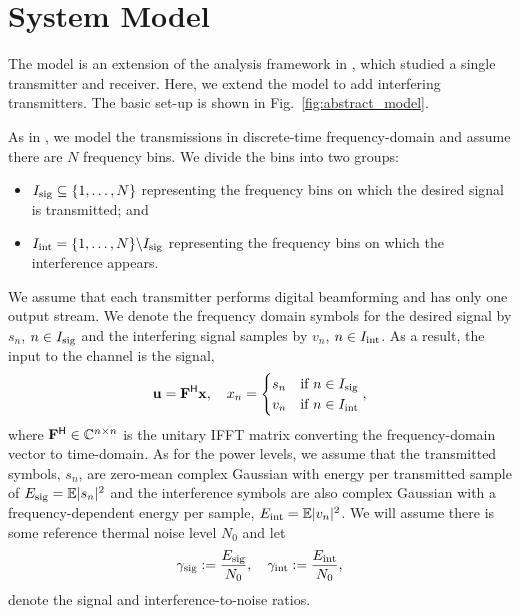 %     

\section{System Model} \label{sec:model}

The model is an extension of the analysis framework in \cite{dutta2020capacity,skrimponis2020power,skrimponis2021towards,skrimponis2020efficient},
which studied a single transmitter and receiver. Here, we extend
the model to add interfering transmitters.
The basic set-up is shown in Fig.~\ref{fig:abstract_model}.

As in \cite{dutta2020capacity,skrimponis2020power,skrimponis2021towards,skrimponis2020efficient}, we model the transmissions in discrete-time 
frequency-domain and assume there are $N$
frequency bins.  We divide the bins into two groups:
\begin{itemize}
    \item $I_{\rm sig} \subseteq \{1,\ldots,N\}$ representing the frequency bins on which the desired signal is transmitted; and
    \item $I_{\rm int} = \{1,\ldots,N\} \backslash I_{\rm sig}$ representing the frequency bins on which the interference appears.
\end{itemize}
We assume that each transmitter performs digital beamforming and has 
only one output stream. We denote the frequency domain symbols for the
desired signal by $s_n$, $n\in I_{\rm sig}$
and the interfering signal samples by $v_n$,
$n \in I_{\rm int}$.  As a result, the input to the channel
is the signal,
\begin{equation}
    {\mathbf{u}} = {\mathbf{F}} ^{\text{\sf H}} {\mathbf{x}}, \quad x_n = \begin{cases}
        s_n & \mbox{if } n \in I_{\rm sig} \\
        v_n & \mbox{if } n \in I_{\rm int}
        \end{cases},
\end{equation}
where ${\mathbf{F}}^{\text{\sf H}} \in {\mathbb{C}}^{n \times n}$ is the unitary 
IFFT matrix converting the frequency-domain vector
to time-domain. As for the power levels, we assume that the transmitted
symbols, $s_n$, 
are zero-mean complex Gaussian with 
energy per transmitted sample of $E_{\rm sig} = \mathbb{E}|s_n|^2$ and the interference symbols are also complex Gaussian with a frequency-dependent energy per sample, $E_{\rm int} = \mathbb{E}|v_n|^2$.
We will assume there is some reference
thermal noise level $N_0$ and let
\[
    \gamma_{\rm sig} := \frac{E_{\rm sig}}{N_0},
    \quad
    \gamma_{\rm int} := \frac{E_{\rm int}}{N_0},
\]
denote the signal and interference-to-noise ratios.

